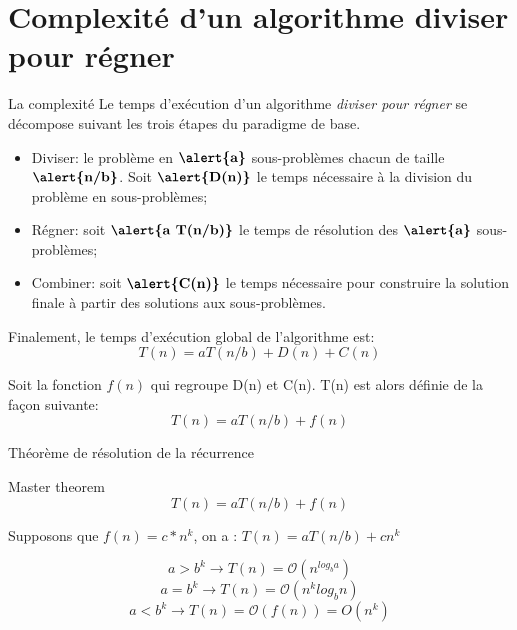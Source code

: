 \documentclass[10pt,xcolor=dvipsnames]{beamer}
\begin{document}
\section{Complexité d'un algorithme diviser pour régner}

\begin{frame}{La complexité}
Le temps d'exécution d'un algorithme \textit{diviser pour régner} se décompose suivant les trois étapes du paradigme de base.


\begin{itemize}
    \item \alert{Diviser}: le problème en $\textbf{\alert{a}}$ sous-problèmes chacun de taille $\textbf{\alert{n/b}}$. Soit $\textbf{\alert{D(n)}}$ le temps nécessaire à la division du problème en sous-problèmes;
    \item \alert{Régner}: soit $\textbf{\alert{a T(n/b)}}$ le temps de résolution des $\textbf{\alert{a}}$ sous-problèmes;
    \item \alert{Combiner}: soit $\textbf{\alert{C(n)}}$ le temps nécessaire pour construire la solution finale à partir des solutions aux sous-problèmes.
\end{itemize}
    
Finalement, le temps d'exécution global de l'algorithme est:
\begin{equation*}
    T(n) = a T(n/b) + D(n) + C(n)
\end{equation*}

Soit la fonction $f(n)$ qui regroupe D(n) et C(n). T(n) est alors définie de la façon suivante:
\begin{equation*}
    T(n) = a T(n/b) + f(n)
\end{equation*}
\end{frame}

\begin{frame}{Théorème de résolution de la récurrence}
\begin{exampleblock}{Master theorem}
\begin{equation*}
    T(n) = a T(n/b) + f(n)
\end{equation*}
\end{exampleblock}


Supposons que $f(n) = c*n^k$, on a : $T(n) = a T(n/b) + c n^k$

\begin{equation*}
    a > b^k \rightarrow T(n) = \mathcal{O}(n^{log_b a})
\end{equation*}
\begin{equation*}
    a = b^k \rightarrow T(n) = \mathcal{O}(n^k log_b n)
\end{equation*}
\begin{equation*}
    a < b^k \rightarrow T(n) = \mathcal{O}( f(n) ) = O(n^k)
\end{equation*}
\end{frame}
\end{document}
